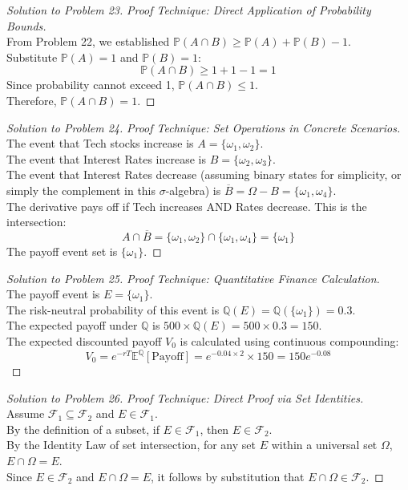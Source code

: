 \documentclass[12pt]{article}
\theoremstyle{definition}
\begin{document}
\begin{proof}[Solution to Problem 23]
\textit{Proof Technique: Direct Application of Probability Bounds.} \\
From Problem 22, we established $\mathbb{P}(A \cap B) \ge \mathbb{P}(A) + \mathbb{P}(B) - 1$. \\
Substitute $\mathbb{P}(A) = 1$ and $\mathbb{P}(B) = 1$:
\[ \mathbb{P}(A \cap B) \ge 1 + 1 - 1 = 1 \]
Since probability cannot exceed 1, $\mathbb{P}(A \cap B) \le 1$. \\
Therefore, $\mathbb{P}(A \cap B) = 1$.
\end{proof}

\begin{proof}[Solution to Problem 24]
\textit{Proof Technique: Set Operations in Concrete Scenarios.} \\
The event that Tech stocks increase is $A = \{\omega_1, \omega_2\}$. \\
The event that Interest Rates increase is $B = \{\omega_2, \omega_3\}$. \\
The event that Interest Rates decrease (assuming binary states for simplicity, or simply the complement in this $\sigma$-algebra) is $\overline{B} = \Omega - B = \{\omega_1, \omega_4\}$. \\
The derivative pays off if Tech increases AND Rates decrease. This is the intersection:
\[ A \cap \overline{B} = \{\omega_1, \omega_2\} \cap \{\omega_1, \omega_4\} = \{\omega_1\} \]
The payoff event set is $\{\omega_1\}$.
\end{proof}

\begin{proof}[Solution to Problem 25]
\textit{Proof Technique: Quantitative Finance Calculation.} \\
The payoff event is $E = \{\omega_1\}$. \\
The risk-neutral probability of this event is $\mathbb{Q}(E) = \mathbb{Q}(\{\omega_1\}) = 0.3$. \\
The expected payoff under $\mathbb{Q}$ is $500 \times \mathbb{Q}(E) = 500 \times 0.3 = 150$. \\
The expected discounted payoff $V_0$ is calculated using continuous compounding:
\[ V_0 = e^{-rT} \mathbb{E}^\mathbb{Q}[\text{Payoff}] = e^{-0.04 \times 2} \times 150 = 150 e^{-0.08} \]
\end{proof}

\begin{proof}[Solution to Problem 26]
\textit{Proof Technique: Direct Proof via Set Identities.} \\
Assume $\mathcal{F}_1 \subseteq \mathcal{F}_2$ and $E \in \mathcal{F}_1$. \\
By the definition of a subset, if $E \in \mathcal{F}_1$, then $E \in \mathcal{F}_2$. \\
By the Identity Law of set intersection, for any set $E$ within a universal set $\Omega$, $E \cap \Omega = E$. \\
Since $E \in \mathcal{F}_2$ and $E \cap \Omega = E$, it follows by substitution that $E \cap \Omega \in \mathcal{F}_2$.
\end{proof}
\end{document}
